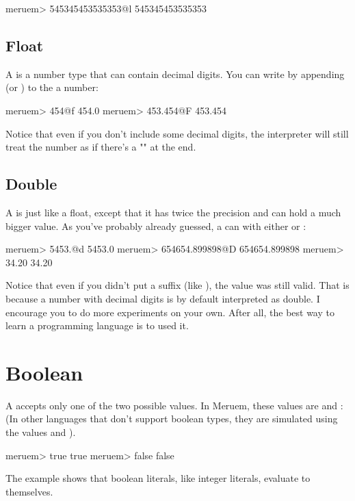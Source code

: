 \begin{REPL}
meruem> 545345453535353@l
545345453535353
\end{REPL}

\subsection{Float}
A  is a number type that can contain decimal digits. You can write  by appending  (or ) to the a number:

\begin{REPL}
meruem> 454@f
454.0
meruem> 453.454@F
453.454
\end{REPL}

Notice that even if you don't include some decimal digits, the interpreter will still treat the number as if there's a "" at the end.

\subsection{Double}
A  is just like a float, except that it has twice the precision and can hold a much bigger value. As you've probably already guessed, a  can with either  or :

\begin{REPL}
meruem> 5453.@d
5453.0
meruem> 654654.899898@D
654654.899898
meruem> 34.20
34.20
\end{REPL}

Notice that even if you didn't put a suffix (like ), the value was still valid. That is because a number with decimal digits is by default interpreted as double. I encourage you to do more experiments on your own. After all, the best way to learn a programming language is to used it.

\section{Boolean}
A  accepts only one of the two possible values. In Meruem, these values are  and : (In other languages that don't support boolean types, they are simulated using the values  and ). 

\begin{REPL}
meruem> true
true
meruem> false
false
\end{REPL}

The example shows that boolean literals, like integer literals, evaluate to themselves.


